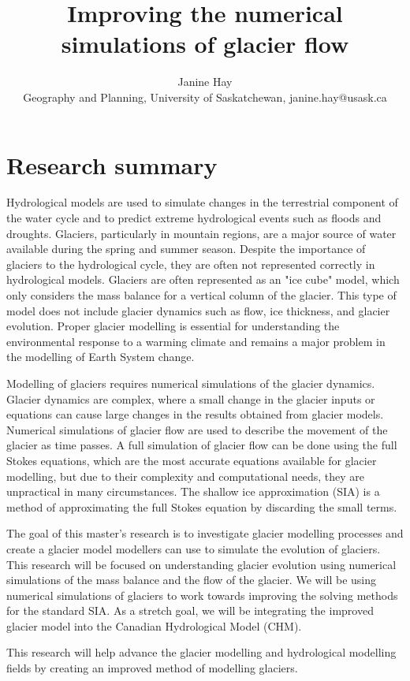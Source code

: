 \documentclass{article}
\title{Improving the numerical simulations of glacier flow}
\author{Janine Hay \\
        \small Geography and Planning, University of Saskatchewan, janine.hay@usask.ca\\

}
\date{} %
\begin{document}
\maketitle
\newpage
\tableofcontents
\newpage
\section{Research summary}
Hydrological models are used to simulate changes in the terrestrial component of the water cycle and to predict extreme hydrological events such as floods and droughts. Glaciers, particularly in mountain regions, are a major source of water available during the spring and summer season. Despite the importance of glaciers to the hydrological cycle, they are often not represented correctly in hydrological models. Glaciers are often represented as an "ice cube" model, which only considers the mass balance for a vertical column of the glacier. This type of model does not include glacier dynamics such as flow, ice thickness, and glacier evolution. Proper glacier modelling is essential for understanding the environmental response to a warming climate and remains a major problem in the modelling of Earth System change.  

Modelling of glaciers requires numerical simulations of the glacier dynamics. Glacier dynamics are complex, where a small change in the glacier inputs or equations can cause large changes in the results obtained from glacier models. Numerical simulations of glacier flow are used to describe the movement of the glacier as time passes. A full simulation of glacier flow can be done using the full Stokes equations, which are the most accurate equations available for glacier modelling, but due to their complexity and computational needs, they are unpractical in many circumstances. The shallow ice approximation (SIA) is a method of approximating the full Stokes equation by discarding the small terms.

The goal of this master's research is to investigate glacier modelling processes and create a glacier model modellers can use to simulate the evolution of glaciers. This research will be focused on understanding glacier evolution using numerical simulations of the mass balance and the flow of the glacier. We will be using numerical simulations of glaciers to work towards improving the solving methods for the standard SIA. As a stretch goal, we will be integrating the improved glacier model into the Canadian Hydrological Model (CHM).

This research will help advance the glacier modelling and hydrological modelling fields by creating an improved method of modelling glaciers. 
\end{document}
